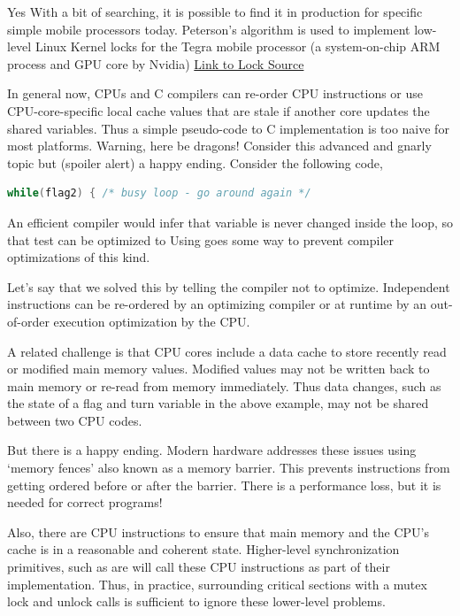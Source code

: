 Yes
With a bit of searching, it is possible to find it in production for specific simple mobile processors today.
Peterson's algorithm is used to implement low-level Linux Kernel locks for the Tegra mobile processor (a system-on-chip ARM process and GPU core by Nvidia) \href{https://android.googlesource.com/kernel/tegra.git/+/android-tegra-3.10/arch/arm/mach-tegra/sleep.S\#58}{Link to Lock Source}

In general now, CPUs and C compilers can re-order CPU instructions or use CPU-core-specific local cache values that are stale if another core updates the shared variables.
Thus a simple pseudo-code to C implementation is too naive for most platforms.
Warning, here be dragons!
Consider this advanced and gnarly topic but (spoiler alert) a happy ending.
Consider the following code,

\begin{lstlisting}[language=C]
while(flag2) { /* busy loop - go around again */
\end{lstlisting}

An efficient compiler would infer that  variable is never changed inside the loop, so that test can be optimized to  Using  goes some way to prevent compiler optimizations of this kind.

Let's say that we solved this by telling the compiler not to optimize.
Independent instructions can be re-ordered by an optimizing compiler or at runtime by an out-of-order execution optimization by the CPU.

A related challenge is that CPU cores include a data cache to store recently read or modified main memory values.
Modified values may not be written back to main memory or re-read from memory immediately.
Thus data changes, such as the state of a flag and turn variable in the above example, may not be shared between two CPU codes.

But there is a happy ending.
Modern hardware addresses these issues using `memory fences' also known as a memory barrier.
This prevents instructions from getting ordered before or after the barrier.
There is a performance loss, but it is needed for correct programs!

Also, there are CPU instructions to ensure that main memory and the CPU's cache is in a reasonable and coherent state.
Higher-level synchronization primitives, such as  are will call these CPU instructions as part of their implementation.
Thus, in practice, surrounding critical sections with a mutex lock and unlock calls is sufficient to ignore these lower-level problems.

